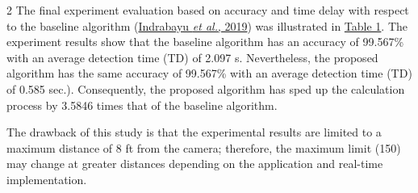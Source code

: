 \documentclass[9pt]{extarticle}
\begin{document}
\begin{multicols}{2}
The final experiment evaluation based on accuracy and time delay with respect to the baseline algorithm (\hyperlink{ref:6}{Indrabayu \textit{et al.}, 2019}) was illustrated in \hyperlink{tab:1}{Table 1}. The experiment results show that the baseline algorithm has an accuracy of 99.567\% with an average detection time (TD) of 2.097 s. Nevertheless, the proposed algorithm has the same accuracy of 99.567\% with an average detection time (TD) of 0.585 sec.). Consequently, the proposed algorithm has sped up the calculation process by 3.5846 times that of the baseline algorithm.

The drawback of this study is that the experimental results are limited to a maximum distance of 8 ft from the camera; therefore, the maximum limit (150) may change at greater distances depending on the application and real-time implementation.

\end{multicols}
\noindent
\end{document}
